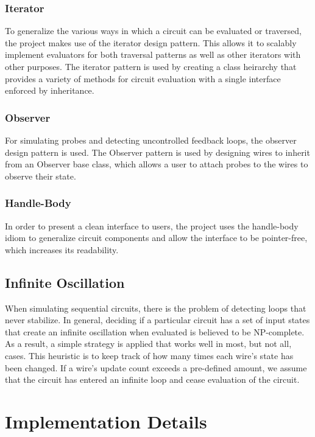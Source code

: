 \documentclass{article}
\begin{document}
\subsubsection{Iterator}

To generalize the various ways in which a circuit can be evaluated or traversed, the project makes use of the iterator design pattern. This allows it to scalably implement evaluators for both traversal patterns as well as other iterators with other purposes. The iterator pattern is used by creating a class heirarchy that provides a variety of methods for circuit evaluation with a single interface enforced by inheritance.

\subsubsection{Observer}

For simulating probes and detecting uncontrolled feedback loops, the observer design pattern is used. The Observer pattern is used by designing wires to inherit from an Observer base class, which allows a user to attach probes to the wires to observe their state.

\subsubsection{Handle-Body}

In order to present a clean interface to users, the project uses the handle-body idiom to generalize circuit components and allow the interface to be pointer-free, which increases its readability.

\subsection{Infinite Oscillation}

When simulating sequential circuits, there is the problem of detecting loops that never stabilize. In general, deciding if a particular circuit has a set of input states that create an infinite oscillation when evaluated is believed to be NP-complete\cite{Cormen-2009}. As a result, a simple strategy is applied that works well in most, but not all, cases. This heuristic is to keep track of how many times each wire’s state has been changed. If a wire's update count exceeds a pre-defined amount, we assume that the circuit has entered an infinite loop and cease evaluation of the circuit.

\section{Implementation Details}
\end{document}

